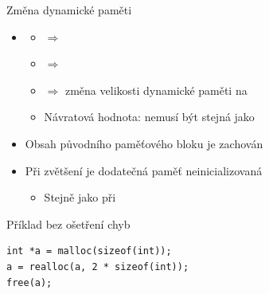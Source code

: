 \begin{frame}[fragile]{Změna dynamické paměti}

  \begin{itemize}
    \item {}
    \begin{itemize}
      \item {} $\Rightarrow$ 
      \item {} $\Rightarrow$ 
      \item {} $\Rightarrow$ změna velikosti dynamické paměti
	na 

      \pause

      \item Návratová hodnota: nemusí být stejná jako 
    \end{itemize}

    \pause

    \item Obsah původního paměťového bloku je zachován

    \pause

    \item Při zvětšení je dodatečná paměť neinicializovaná
    \begin{itemize}
      \item Stejně jako při 
    \end{itemize}
  \end{itemize}


  \begin{block}{Příklad bez ošetření chyb}
    \begin{lstlisting}[belowskip=0pt]
int *a = malloc(sizeof(int));
a = realloc(a, 2 * sizeof(int));
free(a);
    \end{lstlisting}
  \end{block}

\end{frame}

